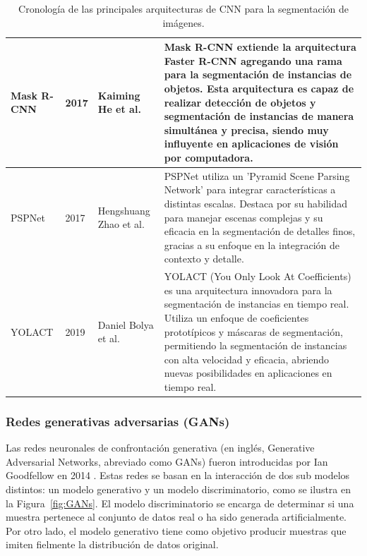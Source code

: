 \begin{table}[H]
\begin{tabular}{|l|l|l|p{6cm}|}
        \hline
        Mask R-CNN      & 2017         & Kaiming He et al.           & Mask R-CNN extiende la arquitectura Faster R-CNN agregando una rama para la segmentación de instancias de objetos. Esta arquitectura es capaz de realizar detección de objetos y segmentación de instancias de manera simultánea y precisa, siendo muy influyente en aplicaciones de visión por computadora.                                \\
        \hline
        PSPNet          & 2017         & Hengshuang Zhao et al.      & PSPNet utiliza un 'Pyramid Scene Parsing Network' para integrar características a distintas escalas. Destaca por su habilidad para manejar escenas complejas y su eficacia en la segmentación de detalles finos, gracias a su enfoque en la integración de contexto y detalle.                                                              \\
        \hline
        YOLACT          & 2019         & Daniel Bolya et al.         & YOLACT (You Only Look At Coefficients) es una arquitectura innovadora para la segmentación de instancias en tiempo real. Utiliza un enfoque de coeficientes prototípicos y máscaras de segmentación, permitiendo la segmentación de instancias con alta velocidad y eficacia, abriendo nuevas posibilidades en aplicaciones en tiempo real. \\
        \hline
    \end{tabular}
    \caption{Cronología de las principales arquitecturas de CNN para la segmentación de imágenes.}
    \label{tab:ArquitecturasCnn}
\end{table}



\subsubsection{Redes generativas adversarias (GANs)}

Las redes neuronales de confrontación generativa (en inglés, Generative Adversarial Networks, abreviado como GANs) fueron introducidas por Ian Goodfellow en 2014 \cite{goodfellow2014generative}. Estas redes se basan en la interacción de dos sub modelos distintos: un modelo generativo y un modelo discriminatorio, como se ilustra en la Figura~\ref{fig:GANs}. El modelo discriminatorio se encarga de determinar si una muestra pertenece al conjunto de datos real o ha sido generada artificialmente. Por otro lado, el modelo generativo tiene como objetivo producir muestras que imiten fielmente la distribución de datos original.

